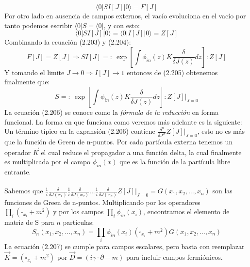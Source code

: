 \begin{equation}
\langle 0|SI[J]|0\rangle=F[J]
\end{equation}
Por otro lado en ausencia de campos externos, el vacío evoluciona en el vacío por tanto podemos escribir $\langle 0|S=\langle 0|$, y con esto:
\begin{equation}
\langle 0|SI[J]|0\rangle=\langle 0|I[J]|0\rangle=Z[J]
\end{equation}
Combinando la ecuación (2.203) y (2.204):
\begin{equation}
F[J]=Z[J]\Rightarrow SI[J]=:\ \exp\left[\int\phi_{in}(z)K\frac{\delta}{\delta J(z)}dz\right]:Z[J]
\end{equation}
Y tomando el limite $J\to 0\Rightarrow I[J]\to 1$ entonces de (2.205) obtenemos finalmente que:
\begin{equation}
S=:\ \exp\left[\int\phi_{in}(z)K\frac{\delta}{\delta J(z)}dz\right]:Z[J]|_{J=0}
\end{equation} 
La ecuación (2.206) se conoce como la \textit{fórmula de la reducción} en forma funcional. La forma en que funciona como veremos más adelante es la siguiente: Un término típico en la expansión (2.206) contiene $\frac{\delta^n}{\delta J^N}Z[J]|_{J=0}$, esto no es más que la función de Green de n-puntos. Por cada partícula externa tenemos un operador $\vec{K}$ el cual reduce el propagador a una función delta, la cual finalmente es multiplicada por el campo $\phi_{in}(x)$ que es la función de la partícula libre entrante.
\\
\\
Sabemos que $\frac{1}{i}\frac{\delta}{\delta J(x_{1})}\frac{1}{i}\frac{\delta}{\delta J(x_{2})}...\frac{1}{i}\frac{\delta}{\delta J(x_{n})}Z[J]|_{J=0}=G(x_{1},x_{2},...,x_{n})$ son las funciones de Green de n-puntos. Multiplicando por los operadores $\prod_{i}(\square_{x_i}+m^2)$ y por los campos $\prod_{i}\phi_{in}(x_i)$, encontramos el elemento de matriz de S para $n$ partículas:
\begin{equation}
S_{n}(x_{1},x_{2},...,x_{n})=\prod_{i}\phi_{in}(x_{i})(\square_{x_{i}}+m^{2})G(x_{1},x_{2},...,x_{n})
\end{equation}
La ecuación (2.207) se cumple para campos escalares, pero basta con reemplazar $\vec{K}=(\square_{x_{i}}+m^{2})$ por $\vec{D}=(i\gamma\cdot\partial-m)$ para incluir campos fermiónicos.

\newpage





